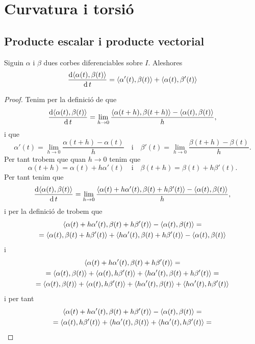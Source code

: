 \documentclass[../../Main.tex]{subfiles}
\begin{document}
\section{Curvatura i torsió}
	\subsection{Producte escalar i producte vectorial}
	\begin{proposition}
		\label{prop:derivada del producte escalar de dues corbes}
		Siguin \(\alpha\) i \(\beta\) dues corbes diferenciables sobre \(I\). Aleshores
		\[\frac{\diff\prodesc{\alpha(t)}{\beta(t)}}{\diff t}=\prodesc{\alpha'(t)}{\beta(t)}+\prodesc{\alpha(t)}{\beta'(t)}\]
		\begin{proof}
			Tenim per la definició de  que
			\[\frac{\diff\prodesc{\alpha(t)}{\beta(t)}}{\diff t}=\lim_{h\to0}\frac{\prodesc{\alpha(t+h)}{\beta(t+h)}-\prodesc{\alpha(t)}{\beta(t)}}{h},\]
			i que
			\[\alpha'(t)=\lim_{h\to0}\frac{\alpha(t+h)-\alpha(t)}{h}\quad\text{i}\quad\beta'(t)=\lim_{h\to0}\frac{\beta(t+h)-\beta(t)}{h}.\]
			Per tant trobem que quan \(h\to0\) tenim que
			\[\alpha(t+h)=\alpha(t)+h\alpha'(t)\quad\text{i}\quad\beta(t+h)=\beta(t)+h\beta'(t).\]
			Per tant tenim que
			\[\frac{\diff\prodesc{\alpha(t)}{\beta(t)}}{\diff t}=\lim_{h\to0}\frac{\prodesc{\alpha(t)+h\alpha'(t)}{\beta(t)+h\beta'(t)}-\prodesc{\alpha(t)}{\beta(t)}}{h},\]
			i per la definició de  trobem que
			\begin{multline*}
				\prodesc{\alpha(t)+h\alpha'(t)}{\beta(t)+h\beta'(t)}-\prodesc{\alpha(t)}{\beta(t)}=\\
				=\prodesc{\alpha(t)}{\beta(t)+h\beta'(t)}+\prodesc{h\alpha'(t)}{\beta(t)+h\beta'(t)}-\prodesc{\alpha(t)}{\beta(t)}
			\end{multline*}
			i
			\begin{multline*}
				\prodesc{\alpha(t)+h\alpha'(t)}{\beta(t)+h\beta'(t)}=\\
				=\prodesc{\alpha(t)}{\beta(t)}+\prodesc{\alpha(t)}{h\beta'(t)}+\prodesc{h\alpha'(t)}{\beta(t)+h\beta'(t)}=\\
				=\prodesc{\alpha(t)}{\beta(t)}+\prodesc{\alpha(t)}{h\beta'(t)}+\prodesc{h\alpha'(t)}{\beta(t)}+\prodesc{h\alpha'(t)}{h\beta'(t)}
			\end{multline*}
			i per tant
			\begin{multline*}
				\prodesc{\alpha(t)+h\alpha'(t)}{\beta(t)+h\beta'(t)}-\prodesc{\alpha(t)}{\beta(t)}=\\
				=\prodesc{\alpha(t)}{h\beta'(t)}+\prodesc{h\alpha'(t)}{\beta(t)}+\prodesc{h\alpha'(t)}{h\beta'(t)}=\\

\end{multline*}
\end{proof}
\end{proposition}
\end{document}
